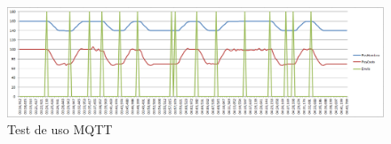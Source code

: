 \begin{figure}[H]
\centering
\includegraphics[width=1.1\textwidth]{figuras/tmqtt.png}
\caption{Test de uso MQTT}
\end{figure}
